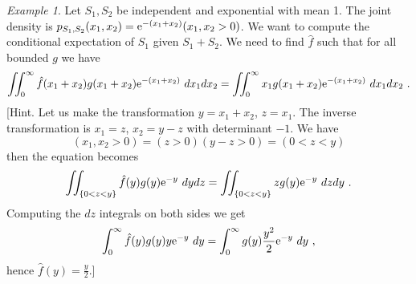 \documentclass[12pt,a4paper]{amsart}
\theoremstyle{plain}%
\theoremstyle{definition}
\theoremstyle{remark}
\newtheorem{example}{Example}
\begin{document}
\begin{example}
Let $S_1,S_2$ be independent and exponential with mean 1. The joint density is $p_{S_1,S_2}(x_1,x_2) = \mathrm{e}^{-(x_1+x_2)}(x_1,x_2 > 0)$. We want to compute the conditional expectation of $S_1$ given $S_1+S_2$. We need to find $\hat f$ such that for all bounded $g$ we have
\begin{equation*}
  \iint_0^\infty \hat f(x_1+x_2)g(x_1+x_2)\mathrm{e}^{-(x_1+x_2)} \ dx_1dx_2 = \iint_0^\infty x_1g(x_1+x_2)\mathrm{e}^{-(x_1+x_2)} \ dx_1dx_2 \ .
\end{equation*}
[Hint. Let us make the transformation $y = x_1 + x_2$, $z = x_1$. The inverse transformation is $x_1 = z$, $x_2 = y - z$ with determinant $-1$. We have
\begin{equation*}
  (x_1,x_2>0) = (z > 0)(y - z > 0) = (0 < z < y)
\end{equation*}
then the equation becomes
\begin{equation*}
  \iint_{\left\{0 < z < y\right\}} \hat f(y)g(y)\mathrm{e}^{-y} \ dydz = \iint_{\left\{0<z<y\right\}} zg(y)\mathrm{e}^{-y} \ dzdy \ .
\end{equation*}
Computing the $dz$ integrals on both sides we get
\begin{equation*}
  \int_0^\infty \hat f(y)g(y)y\mathrm{e}^{-y} \ dy = \int_0^\infty g(y) \frac{y^2}2 \mathrm{e}^{-y} \ dy \ ,
\end{equation*}
hence $\hat f(y) = \frac y  2$.]
\end{example}
\end{document}
